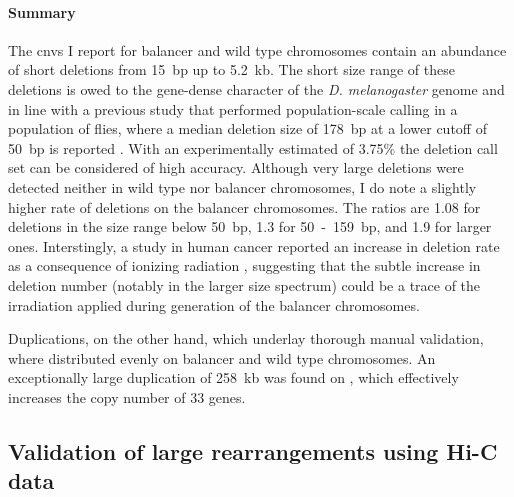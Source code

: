 \paragraph{Summary} The \acp{cnv} I report for balancer and wild type
chromosomes contain an abundance of short deletions from 15~bp up
to 5.2~kb. The short size range of these deletions is owed to the gene-dense
character of the \textit{D. melanogaster} genome and in line with a previous
study that performed population-scale \sv calling in a population of flies,
where a median deletion size of 178~bp at a lower cutoff of 50~bp is reported
\citep{Zichner2013}.
With an experimentally estimated \fdr of 3.75\% the deletion call set can be
considered of high accuracy. Although very large deletions were
detected neither in wild type nor balancer chromosomes, I do note a slightly
higher rate of deletions on the balancer chromosomes. The ratios are 1.08 for
deletions in the size range below 50~bp, 1.3 for 50~-~159~bp, and 1.9 for larger
ones. Interstingly, a study in human cancer reported an increase in deletion
rate as a consequence of ionizing radiation \citep{Behjati2016}, suggesting that the
subtle increase in deletion number (notably in the larger size spectrum) could
be a trace of the irradiation applied during generation of the
balancer chromosomes.

Duplications, on the other hand, which underlay thorough manual validation,
where distributed evenly on balancer and wild type chromosomes. An exceptionally
large duplication of 258~kb was found on \cyo, which effectively
increases the copy number of 33 genes.






\subsection{Validation of large rearrangements using Hi-C data}
\label{sec:balancer_hic_svs}

